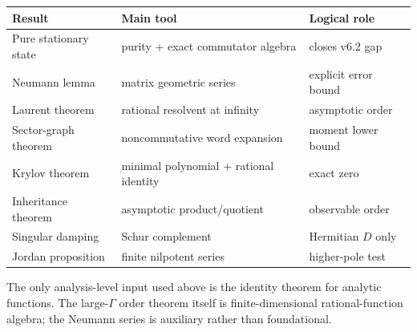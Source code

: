 \documentclass[11pt,a4paper]{article}
\theoremstyle{remark}
\begin{document}
\begin{center}
\renewcommand{\arraystretch}{1.25}
\begin{tabular}{lll}
\toprule
Result & Main tool & Logical role\\
\midrule
Pure stationary state & purity + exact commutator algebra & closes v6.2 gap\\
Neumann lemma & matrix geometric series & explicit error bound\\
Laurent theorem & rational resolvent at infinity & asymptotic order\\
Sector-graph theorem & noncommutative word expansion & moment lower bound\\
Krylov theorem & minimal polynomial + rational identity & exact zero\\
Inheritance theorem & asymptotic product/quotient & observable order\\
Singular damping & Schur complement & Hermitian $D$ only\\
Jordan proposition & finite nilpotent series & higher-pole test\\
\bottomrule
\end{tabular}
\end{center}

\bigskip
\noindent
The only analysis-level input used above is the identity theorem for analytic
functions.  The large-$\Gamma$ order theorem itself is finite-dimensional
rational-function algebra; the Neumann series is auxiliary rather than
foundational.
\end{document}
